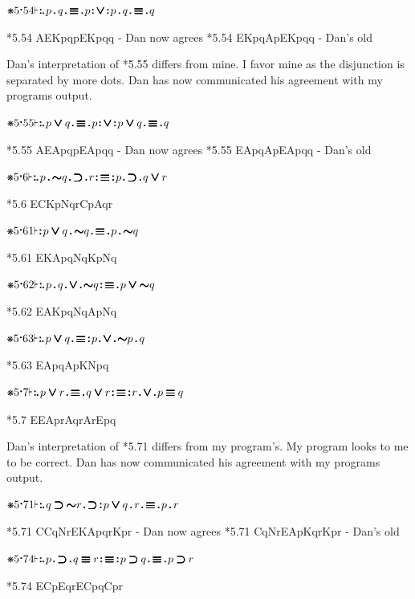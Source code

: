 \documentclass[12pt]{article}
\newcommand{\pmthm}{\mathpunct{\text{\scalebox{.5}[1]{$\boldsymbol\vdash$}}}} %
\newcommand{\pmast}{\text{\resizebox{!}{.75\height}{\ding{107}}}} %
\newcommand{\pmcdot}{\text{\raisebox{.05cm}{$\boldsymbol\cdot$}}} %
\newcommand{\pmd}{\hbox{\rule{.3ex}{.3ex}}} %
\newcommand{\pmdd}{\overset{\pmd}{\pmd}} %
\newcommand{\pmdot}{\mathinner{\pmd}}
\newcommand{\pmdott}{\mathinner{\pmdd}}
\newcommand{\pmdottt}{\mathinner{\pmdd\hspace{1pt}\pmd}}
\newcommand{\pmnot}{\mathord{\ooalign{$\boldsymbol{\sim}\mkern.5mu$\hidewidth\cr$\boldsymbol{\sim}$\cr\hidewidth$\mkern.5mu\boldsymbol{\sim}$}}}
\newcommand{\pmor}{\mathbin{\ooalign{$\boldsymbol{\vee}\mkern.5mu$\hidewidth\cr$\boldsymbol{\vee}$\cr\hidewidth$\mkern.5mu\boldsymbol{\vee}$}}}
\newcommand{\pmimp}{\mathbin{\ooalign{$\boldsymbol{\supset}\mkern.5mu$\hidewidth\cr$\boldsymbol{\supset}$\cr\hidewidth$\mkern.5mu\boldsymbol{\supset}$}}} %
\newcommand{\pmand}{\mathbin{\pmd}}%
\newcommand{\pmiff}{\mathbin{\ooalign{$\boldsymbol{\equiv}\mkern.5mu$\hidewidth\cr$\boldsymbol{\equiv}$\cr\hidewidth$\mkern.5mu\boldsymbol{\equiv}$}}} %
\begin{document}
$\pmast 5 \pmcdot 54 \pmthm \pmdottt p \pmand q \pmdot \pmiff \pmdot p \pmdott \pmor \pmdott p \pmand q \pmdot \pmiff \pmdot q  $

*5.54 AEKpqpEKpqq - Dan now agrees
*5.54 EKpqApEKpqq - Dan's old

Dan's interpretation of *5.55 differs from mine. I favor mine as the disjunction is separated by more dots.  Dan has now communicated his agreement with my programs output.

$\pmast 5 \pmcdot 55 \pmthm \pmdottt p \pmor q \pmdot \pmiff \pmdot p \pmdott \pmor \pmdott p \pmor q \pmdot \pmiff \pmdot q    $

*5.55 AEApqpEApqq - Dan now agrees
*5.55 EApqApEApqq - Dan's old

$\pmast 5 \pmcdot 6 \pmthm \pmdottt p \pmand \pmnot q \pmdot \pmimp \pmdot r \pmdott \pmiff \pmdott p \pmdot \pmimp \pmdot q \pmor r     $

*5.6 ECKpNqrCpAqr

$\pmast 5 \pmcdot 61 \pmthm \pmdott p \pmor q \pmand \pmnot q \pmdot \pmiff \pmdot p \pmand \pmnot q $

*5.61 EKApqNqKpNq

$\pmast 5 \pmcdot 62 \pmthm \pmdottt p \pmand q \pmdot \pmor \pmdot \pmnot q \pmdott \pmiff \pmdot p \pmor \pmnot q $

*5.62 EAKpqNqApNq

$\pmast 5 \pmcdot 63 \pmthm \pmdottt p \pmor q \pmdot \pmiff \pmdott p \pmdot \pmor \pmdot \pmnot p \pmand q   $

*5.63 EApqApKNpq

$\pmast 5 \pmcdot 7 \pmthm \pmdottt p \pmor r \pmdot \pmiff \pmdot q \pmor r \pmdott \pmiff \pmdott r \pmdot \pmor \pmdot p \pmiff q   $

*5.7 EEAprAqrArEpq

Dan's interpretation of *5.71 differs from my program's. My program looks to me to be correct.  Dan has now communicated his agreement with my programs output.

$\pmast 5 \pmcdot 71 \pmthm \pmdottt q \pmimp \pmnot r \pmdot \pmimp \pmdott p \pmor q \pmand r \pmdot \pmiff \pmdot p \pmand r   $

*5.71 CCqNrEKApqrKpr - Dan now agrees 
*5.71 CqNrEApKqrKpr  - Dan's old


$\pmast 5 \pmcdot 74 \pmthm \pmdottt p \pmdot \pmimp \pmdot q \pmiff r \pmdott \pmiff \pmdott p \pmimp q \pmdot \pmiff \pmdot p \pmimp r $

*5.74 ECpEqrECpqCpr
\end{document}
